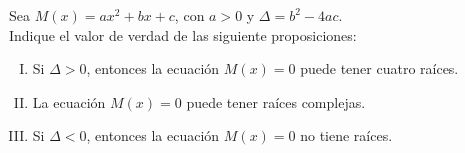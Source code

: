 \noindent
Sea $ M(x)\!=\!ax^2\!+\!bx\!+\!c$, con $a>0 $ y $\Delta=b^2-4ac$.\\
Indique el valor de verdad de las siguiente proposiciones:
\begin{enumerate}[I.]
	\item Si $\Delta>0$, entonces la ecuación $M(x)=0$ puede tener cuatro raíces.

	\item La ecuación $M(x)=0$ puede tener raíces complejas. 
	\item Si $\Delta<0$, entonces la ecuación $M(x)=0$ no tiene raíces.
\end{enumerate}
